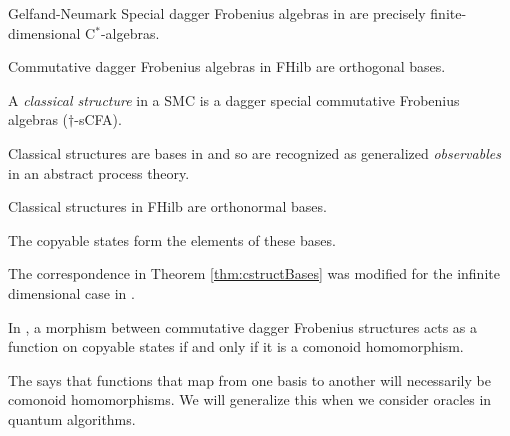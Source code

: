 \begin{defn}
\end{defn}

\begin{theorem}{Gelfand-Neumark}
Special dagger Frobenius algebras in  are precisely finite-dimensional C$^*$-algebras.
\end{theorem}

\begin{theorem}{\cite[Thm 5.1]{coecke2013new}}
Commutative dagger Frobenius algebras in FHilb are orthogonal bases.
\end{theorem}

\begin{defn}
A \emph{classical structure} in a SMC is a dagger special commutative Frobenius algebras ($\dagger$-sCFA).
\end{defn}
\noindent Classical structures are bases in  and so are recognized as generalized \emph{observables} in an abstract process theory.

\begin{theorem}{\cite[Sec 6]{coecke2013new}}
\label{thm:cstructBases}
Classical structures in FHilb are orthonormal bases.
\end{theorem}

\noindent The copyable states form the elements of these bases.

\begin{remark}
The correspondence in Theorem \ref{thm:cstructBases} was modified for the infinite dimensional case in \cite{abramsky2012h}.
\end{remark}

\begin{theorem}
\end{theorem}

\begin{corollary}
In , a morphism between commutative dagger Frobenius structures acts as a function on copyable states if and only if it is a comonoid homomorphism.
\end{corollary}

The says that functions that map from one basis to another will necessarily be comonoid homomorphisms.  We will generalize this when we consider oracles in quantum algorithms.

